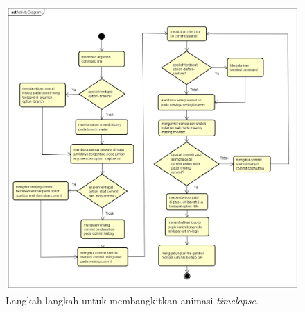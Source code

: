 \begin{figure}[H]
	\centering
		\includegraphics[scale=0.5]{Gambar/ActivityDiagram.png}
	\caption{Langkah-langkah untuk membangkitkan animasi \textit{timelapse}.}
	\label{fig:ac}
\end{figure}



